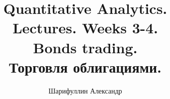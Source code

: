 \documentclass{article}
\title{Quantitative Analytics.\\
Lectures. Weeks 3-4. \\
Bonds trading.\\
Торговля облигациями.}
\author{Шарифуллин Александр}
\begin{document}
\maketitle

\setcounter{tocdepth}{1} %
\renewcommand\contentsname{Содержание}
\tableofcontents
\newpage




\renewcommand{\labelitemi}{\tiny$\bullet$}
\renewcommand{\figurename}{Fig.}
\def\Ruble{\stackengine{.64ex}{%
  \stackengine{.4ex}{\textbf{\textsf{P}}}{\rule{1ex}{.16ex}\kern.55ex}{O}{r}{F}{F}{L}%
  }{\rule{1ex}{.16ex}\kern.55ex}{O}{r}{F}{F}{L}\kern-.1ex}
\def\yenrule{\rule{1.3ex}{.1ex}}
\def\textyen{\renewcommand\stacktype{L}\stackon[.4ex]{\stackon[.65ex]{Y}{\yenrule}}{\yenrule}}
\end{document}
